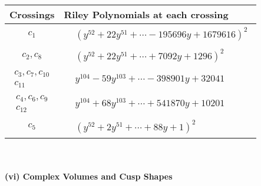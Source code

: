 \documentclass[1p]{elsarticle_modified}
\theoremstyle{definition}
\begin{document}
\begin{tabular}{m{50pt}|m{274pt}}
Crossings & \hspace{64pt}Riley Polynomials at each crossing \\
\hline $$\begin{aligned}c_{1}\end{aligned}$$&$\begin{aligned}
&(y^{52}+22 y^{51}+\cdots-195696 y+1679616)^{2}
\end{aligned}$\\
\hline $$\begin{aligned}c_{2},c_{8}\end{aligned}$$&$\begin{aligned}
&(y^{52}+22 y^{51}+\cdots+7092 y+1296)^{2}
\end{aligned}$\\
\hline $$\begin{aligned}c_{3},c_{7},c_{10}\\c_{11}\end{aligned}$$&$\begin{aligned}
&y^{104}-59 y^{103}+\cdots-398901 y+32041
\end{aligned}$\\
\hline $$\begin{aligned}c_{4},c_{6},c_{9}\\c_{12}\end{aligned}$$&$\begin{aligned}
&y^{104}+68 y^{103}+\cdots+541870 y+10201
\end{aligned}$\\
\hline $$\begin{aligned}c_{5}\end{aligned}$$&$\begin{aligned}
&(y^{52}+2 y^{51}+\cdots+88 y+1)^{2}
\end{aligned}$\\
\hline
\end{tabular}\\~\\
\newpage\flushleft \textbf{(vi) Complex Volumes and Cusp Shapes}
\end{document}
